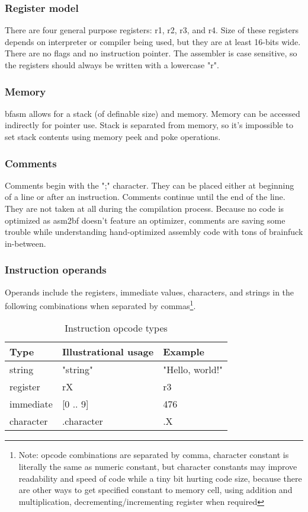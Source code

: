 \documentclass{article}
\begin{document}
\subsubsection{Register model}
\par There are four general purpose registers: r1, r2, r3, and r4. Size of these registers depends on
interpreter or compiler being used, but they are at least 16-bits wide. There are no flags and no
instruction pointer. The assembler is case sensitive, so the registers should always be written with
a lowercase "r".

\subsubsection{Memory}
\par bfasm allows for a stack (of definable size) and memory. Memory can be accessed indirectly for pointer use. Stack is separated from memory, so it's impossible to set stack contents using memory peek and poke operations.

\subsubsection{Comments}
\par Comments begin with the ";" character. They can be placed either at beginning of a line or after an instruction. Comments continue until the end of the line. They are not taken at all during the compilation process. Because no code is optimized as asm2bf doesn't feature an optimizer, comments are saving some trouble while understanding hand-optimized assembly code with tons of brainfuck in-between.

\subsubsection{Instruction operands}
\par Operands include the registers, immediate values, characters, and strings in the following combinations when separated by commas\footnote{Note: opcode combinations are separated by comma, character constant is literally the same as numeric constant, but character constants may improve readability and speed of code while a tiny bit hurting code size, because there are other ways to get specified constant to memory cell, using addition and multiplication, decrementing/incrementing register when required}.

\begin{table}[h]
\centering
\caption{Instruction opcode types}
\label{tab:instropcode}
\begin{tabular}{|l|l|l|}
\hline
\textbf{Type} & \textbf{Illustrational usage} & \textbf{Example} \\ \hline
string & "string" & "Hello, world!" \\ \hline
register & rX & r3 \\ \hline
immediate & [0 .. 9] & 476 \\ \hline
character & .character & .X \\ \hline
\end{tabular}
\end{table}
\end{document}
